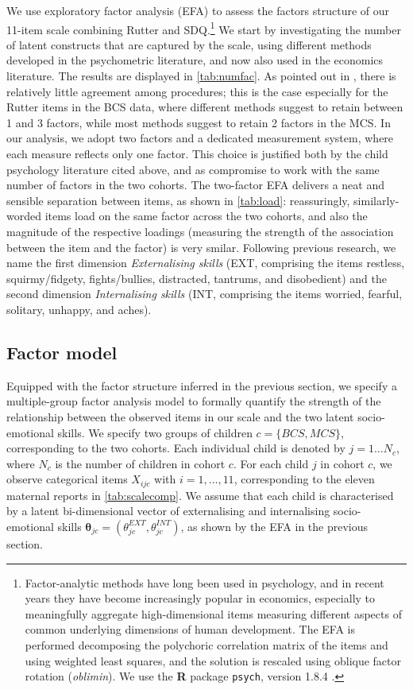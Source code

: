 We use exploratory factor analysis (EFA) to assess the factors structure of our 11-item scale combining Rutter and SDQ.\footnote{Factor-analytic methods have long been used in psychology, and in recent years they have become increasingly popular in economics, especially to meaningfully aggregate high-dimensional items measuring different aspects of common underlying dimensions of human development. The EFA is performed decomposing the polychoric correlation matrix of the items and using weighted least squares, and the solution is rescaled using oblique factor rotation (\emph{oblimin}). We use the \textbf{\textsf{R}} package \texttt{psych}, version 1.8.4 \citep{Revelle2018}.} We start by investigating the number of latent constructs that are captured by the scale, using different methods developed in the psychometric literature, and now also used in the economics literature. The results are displayed in \autoref{tab:numfac}. As pointed out in \citet{conti2014bayesian}, there is relatively little agreement among procedures; this is the case especially for the Rutter items in the BCS data, where different methods suggest to retain between 1 and 3 factors, while most methods suggest to retain 2 factors in the MCS. In our analysis, we adopt two factors and a dedicated measurement system, where each measure reflects only one factor. This choice is justified both by the child psychology literature cited above, and as compromise to work with the same number of factors in the two cohorts. The two-factor EFA delivers a neat and sensible separation between items, as shown in \autoref{tab:load}: reassuringly, similarly-worded items load on the same factor across the two cohorts, and also the magnitude of the respective loadings (measuring the strength of the association between the item and the factor) is very smilar. Following previous research, we name the first dimension \emph{Externalising skills} (EXT, comprising the items restless, squirmy/fidgety, fights/bullies, distracted, tantrums, and disobedient) and the second dimension \emph{Internalising skills} (INT, comprising the items worried, fearful, solitary, unhappy, and aches).

\subsection{Factor model \label{sec:fm}}

Equipped with the factor structure inferred in the previous section, we specify a multiple-group factor analysis model to formally quantify the strength of the relationship between the observed items in our scale and the two latent socio-emotional skills. We specify two groups of children $c=\{BCS,MCS\}$, corresponding to the two cohorts. Each individual child is denoted by $j=1\dots N_c$, where $N_c$ is the number of children in cohort $c$. For each child $j$ in cohort $c$, we observe categorical items $X_{ijc}$ with $i=1,\dots,11$, corresponding to the eleven maternal reports in \autoref{tab:scalecomp}. We assume that each child is characterised by a latent bi-dimensional vector of externalising and internalising socio-emotional skills $\bm{\theta}_{jc} = (\theta_{jc}^{EXT},\theta_{jc}^{INT})$, as shown by the EFA in the previous section.

